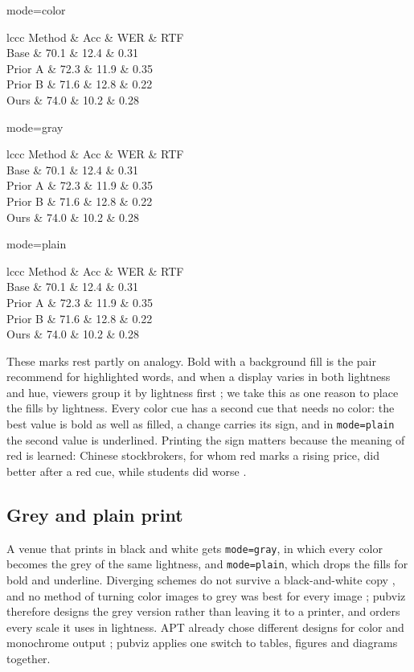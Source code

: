 \documentclass[11pt]{article}
\newcommand\code[1]{\texttt{#1}}
\begin{document}
\begin{table}[tb]
  \centering\scriptsize
  \setlength{\tabcolsep}{2.4pt}
  \newcommand\demo[1]{%
    \begin{minipage}[t]{0.325\linewidth}\centering
      \textsf{mode=#1}\par\smallskip
      \pvsetup{mode=#1}%
      \begin{pvtable}[delta=absolute]{lccc}
        \toprule
        Method & Acc \pvup & WER \pvdown & RTF \pvdown \\
        \midrule
        \pvbaseline Base & 70.1 & 12.4 & 0.31 \\
        Prior A & 72.3 & 11.9 & 0.35 \\
        Prior B & 71.6 & 12.8 & 0.22 \\
        \pvours Ours & 74.0 & 10.2 & 0.28 \\
        \bottomrule
      \end{pvtable}
      \pvkey[baseline=Base]
    \end{minipage}}
  \caption{\textbf{The same table keeps its meaning in color, in grey and
    without color.} The package marks the best value in bold with a fill and
    the second with a lighter fill, adds each change against the baseline,
    and writes the key from what the table shows. Illustrative numbers.}
  \label{tab:modes}
  \demo{color}\hfill\demo{gray}\hfill\demo{plain}
\end{table}

These marks rest partly on analogy. Bold with a background fill is the pair
\citet[Sec.~8.1]{strobelt2016guidelines} recommend for highlighted words, and
when a display varies in both lightness and hue, viewers group it by
lightness first \citep[p.~1176]{healey2012attention}; we take this as one
reason to place the fills by lightness. Every color cue has a
second cue that needs no color: the best value is bold as well as filled, a
change carries its sign, and in \code{mode=plain} the second value is
underlined. Printing the sign matters because the meaning of red is learned:
Chinese stockbrokers, for whom red marks a rising price, did better after a
red cue, while students did worse \citep[Results]{zhang2014experience}.

\subsection{Grey and plain print}

A venue that prints in black and white gets \code{mode=gray}, in which every
color becomes the grey of the same lightness, and \code{mode=plain}, which
drops the fills for bold and underline. Diverging schemes do not survive a
black-and-white copy \citep[p.~30]{harrower2003colorbrewer}, and no method of
turning color images to grey was best for every image
\citep[Sec.~4.2]{cadik2008perceptual}; pubviz therefore designs the grey
version rather than leaving it to a printer, and orders every scale it uses
in lightness. APT already chose different designs for color and monochrome
output \citep[Sec.~9]{mackinlay1986apt}; pubviz applies one switch to
tables, figures and diagrams together.
\end{document}

